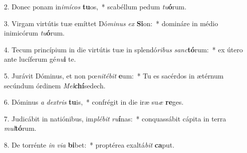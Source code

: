 2. Donec ponam in\textit{i}\textit{mí}\textit{cos} \textbf{tu}os,~*  scabéllum pedum \textit{tu}\textbf{ó}rum.\

3. Virgam virtútis tuæ emíttet Dó\textit{mi}\textit{nus} \textit{ex} \textbf{Si}on:~*  domináre in médio inimicórum \textit{tu}\textbf{ó}rum.\

4. Tecum princípium in die virtútis tuæ in splendó\textit{ri}\textit{bus} \textit{sanc}\textbf{tó}rum:~*  ex útero ante lucíferum gé\textit{nu}\textbf{i} te.\

5. Jurávit Dóminus, et non pœ\textit{ni}\textit{té}\textit{bit} \textbf{e}um:~*  Tu es sacérdos in ætérnum secúndum órdinem \textit{Mel}\textbf{chí}sedech.\

6. Dóminus \textit{a} \textit{dex}\textit{tris} \textbf{tu}is,~*  confrégit in die iræ su\textit{æ} \textbf{re}ges.\

7. Judicábit in natiónibus, im\textit{plé}\textit{bit} \textit{ru}\textbf{í}nas:~*  conquassábit cápita in terra \textit{mul}\textbf{tó}rum.\

8. De torrénte \textit{in} \textit{vi}\textit{a} \textbf{bi}bet:~*  proptérea exaltá\textit{bit} \textbf{ca}put.\

